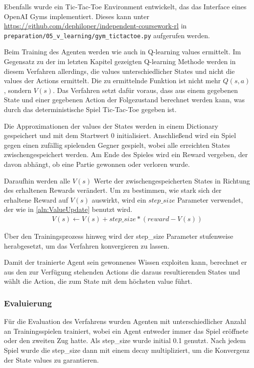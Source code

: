\documentclass[11pt]{scrartcl}
\begin{document}
Ebenfalls wurde ein Tic-Tac-Toe Environment entwickelt, das das Interface eines OpenAI
Gyms implementiert. Dieses kann unter
\url{https://github.com/dephiloper/independent-coursework-rl} in
\lstinline!preparation/05_v_learning/gym_tictactoe.py! aufgerufen werden.

Beim Training des Agenten werden wie auch in Q-learning values ermittelt. Im Gegensatz zu
der im letzten Kapitel gezeigten Q-learning Methode werden in diesem Verfahren allerdings, 
die values unterschiedlicher States und nicht die values der Actions ermittelt. Die zu
ermittelnde Funktion ist nicht mehr $Q(s, a)$, sondern $V(s)$. Das Verfahren setzt dafür
voraus, dass aus einem gegebenen State und einer gegebenen Action der Folgezustand berechnet
werden kann, was durch das deterministische Spiel Tic-Tac-Toe gegeben ist.

Die Approximationen der values der States werden in einem Dictionary gespeichert und mit
dem Startwert 0 initialisiert. Anschließend wird ein Spiel gegen einen zufällig spielenden
Gegner gespielt, wobei alle erreichten States zwischengespeichert werden. Am Ende des
Spieles wird ein Reward vergeben, der davon abhängt, ob eine Partie gewonnen oder verloren
wurde.

Daraufhin werden alle $V(s)$ Werte der zwischengespeicherten States in Richtung des
erhaltenen Rewards verändert. Um zu bestimmen, wie stark sich der erhaltene Reward auf
$V(s)$ auswirkt, wird ein $step\_size$ Parameter verwendet, der wie in 
\autoref{aln:ValueUpdate} benutzt wird.
\begin{align}
  V(s) \leftarrow V(s) + step\_size * (reward - V(s))
  \label{aln:ValueUpdate}
\end{align}
\noindent

Über den Trainingsprozess hinweg wird der step\_size Parameter stufenweise herabgesetzt,
um das Verfahren konvergieren zu lassen.

Damit der trainierte Agent sein gewonnenes Wissen exploiten kann, berechnet er aus den
zur Verfügung stehenden Actions die daraus resultierenden States und wählt die Action, die
zum State mit dem höchsten value führt.

\subsubsection{Evaluierung}
Für die Evaluation des Verfahrens wurden Agenten mit unterschiedlicher Anzahl an
Trainingsspielen trainiert, wobei ein Agent entweder immer das Spiel eröffnete oder
den zweiten Zug hatte. Als step\_size wurde initial 0.1 genutzt. Nach jedem Spiel wurde
die step\_size dann mit einem decay multipliziert, um die Konvergenz der State values
zu garantieren.
\end{document}
